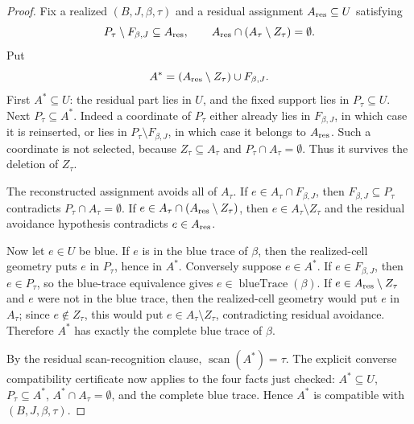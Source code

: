 \begin{proof}
Fix a realized \((B,J,\beta,\tau)\) and a residual assignment
\(A_{\rm res}\subseteq U\) satisfying
\[
P_\tau\setminus F_{\beta,J}\subseteq A_{\rm res},\qquad
A_{\rm res}\cap(A_\tau\setminus Z_\tau)=\emptyset .
\]
Put
\[
A^\ast=(A_{\rm res}\setminus Z_\tau)\cup F_{\beta,J}.
\]
First \(A^\ast\subseteq U\): the residual part lies in \(U\), and the fixed
support lies in \(P_\tau\subseteq U\).  Next \(P_\tau\subseteq A^\ast\).
Indeed a coordinate of \(P_\tau\) either already lies in \(F_{\beta,J}\), in
which case it is reinserted, or lies in \(P_\tau\setminus F_{\beta,J}\), in
which case it belongs to \(A_{\rm res}\).  Such a coordinate is not selected,
because \(Z_\tau\subseteq A_\tau\) and \(P_\tau\cap A_\tau=\emptyset\).
Thus it survives the deletion of \(Z_\tau\).

The reconstructed assignment avoids all of \(A_\tau\).  If
\(e\in A_\tau\cap F_{\beta,J}\), then
\(F_{\beta,J}\subseteq P_\tau\) contradicts
\(P_\tau\cap A_\tau=\emptyset\).  If
\(e\in A_\tau\cap(A_{\rm res}\setminus Z_\tau)\), then
\(e\in A_\tau\setminus Z_\tau\) and the residual avoidance hypothesis
contradicts \(e\in A_{\rm res}\).

Now let \(e\in U\) be blue.  If \(e\) is in the blue trace of \(\beta\),
then the realized-cell geometry puts \(e\) in \(P_\tau\), hence in
\(A^\ast\).  Conversely suppose \(e\in A^\ast\).  If \(e\in F_{\beta,J}\),
then \(e\in P_\tau\), so the blue-trace equivalence gives
\(e\in\operatorname{blueTrace}(\beta)\).  If
\(e\in A_{\rm res}\setminus Z_\tau\) and \(e\) were not in the blue trace,
then the realized-cell geometry would put \(e\) in \(A_\tau\); since
\(e\notin Z_\tau\), this would put \(e\in A_\tau\setminus Z_\tau\),
contradicting residual avoidance.  Therefore \(A^\ast\) has exactly the
complete blue trace of \(\beta\).

By the residual scan-recognition clause, \(\operatorname{scan}(A^\ast)=\tau\).
The explicit converse compatibility certificate now applies to the four
facts just checked: \(A^\ast\subseteq U\), \(P_\tau\subseteq A^\ast\),
\(A^\ast\cap A_\tau=\emptyset\), and the complete blue trace.  Hence
\(A^\ast\) is compatible with \((B,J,\beta,\tau)\).


\end{proof}
